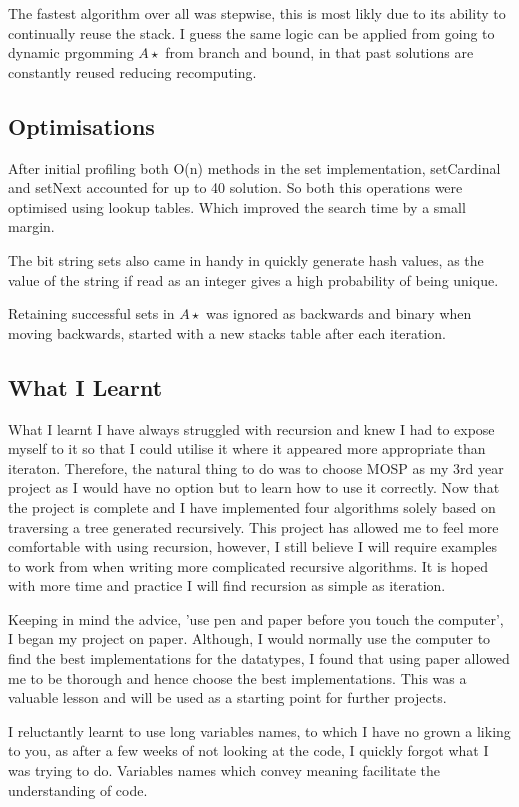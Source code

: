 The fastest algorithm over all was stepwise, this is most likly due to its
ability to continually reuse the stack. I guess the same logic can be applied
from going to dynamic prgomming $A\star$ from branch and bound, in that past solutions are constantly reused reducing recomputing.

\subsection{Optimisations}
After initial profiling both O(n) methods in the set implementation,
setCardinal and setNext accounted for up to 40%
solution. So both this operations were optimised using lookup tables.  Which
improved the search time by a small margin.

The bit string sets also came in handy in quickly generate hash values, as the
value of the string if read as an integer gives a high probability of being
unique.

Retaining successful sets in $A\star$ was ignored as backwards and binary when moving backwards,  started with a new stacks table after each iteration.

\subsection{What I Learnt}
 What I learnt I have always struggled with recursion and knew I had to expose
myself to it so that I could utilise it where it appeared more appropriate than
iteraton. Therefore, the natural thing to do was to choose MOSP as my 3rd year
project as I would have no option but to learn how to use it correctly.  Now
that the project is complete and I have implemented four algorithms solely
based on traversing a tree generated recursively. This project has allowed me
to feel more comfortable with using recursion, however, I still believe I will
require examples to work from when writing more complicated recursive
algorithms. It is hoped with more time and practice I will find recursion as
simple as iteration.  

Keeping in mind the advice, 'use pen and paper before you touch the computer',
I began my project on paper. Although, I would normally use the computer to
find the best implementations for the datatypes, I found that using paper
allowed me to be thorough and hence choose the best implementations. This was a
valuable lesson and will be used as a starting point for further projects. 

I reluctantly learnt to use long variables names, to which I have no grown a
liking to you, as after a few weeks of not looking at the code, I quickly
forgot what I was trying to do. Variables names which convey meaning facilitate
the understanding of code.

